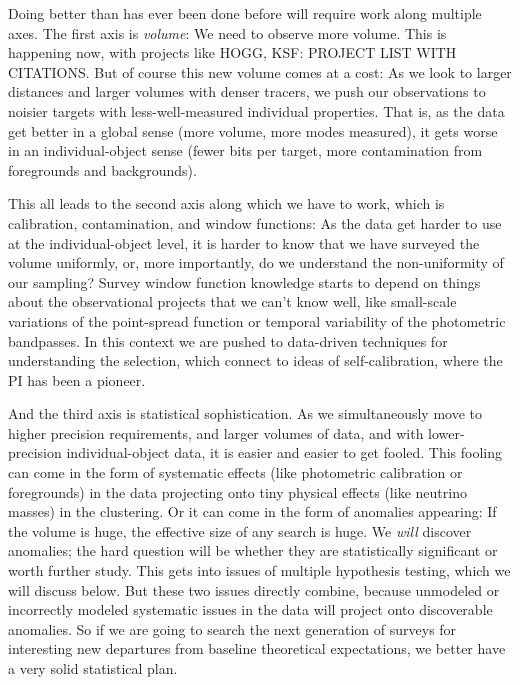 \documentclass[12pt, fullpage, letterpaper]{article}
\begin{document}
Doing better than has ever been done before will require work along
multiple axes.
The first axis is \emph{volume}: We need to observe more volume. This
is happening now, with projects like HOGG, KSF: PROJECT LIST WITH
CITATIONS.
But of course this new volume comes at a cost: As we look to larger
distances and larger volumes with denser tracers, we push our
observations to noisier targets with less-well-measured individual
properties.
That is, as the data get better in a global sense (more volume, more
modes measured), it gets worse in an individual-object sense (fewer
bits per target, more contamination from foregrounds and backgrounds).

This all leads to the second axis along which we have to work, which
is calibration, contamination, and window functions:
As the data get harder to use at the individual-object level, it is
harder to know that we have surveyed the volume uniformly, or, more
importantly, do we understand the non-uniformity of our sampling?
Survey window function knowledge starts to depend on things about the
observational projects that we can't know well, like small-scale
variations of the point-spread function or temporal variability of the
photometric bandpasses.
In this context we are pushed to data-driven techniques for
understanding the selection, which connect to ideas of
self-calibration, where the PI has been a pioneer.

And the third axis is statistical sophistication.
As we simultaneously move to higher precision requirements, and larger
volumes of data, and with lower-precision individual-object data, it is 
easier and easier to get fooled.
This fooling can come in the form of systematic effects (like
photometric calibration or foregrounds) in the data projecting onto
tiny physical effects (like neutrino masses) in the clustering.
Or it can come in the form of anomalies appearing: If the volume is
huge, the effective size of any search is huge.
We \emph{will} discover anomalies; the hard question will be whether
they are statistically significant or worth further study.
This gets into issues of multiple hypothesis testing, which we will
discuss below.
But these two issues directly combine, because unmodeled or
incorrectly modeled systematic issues in the data will project onto
discoverable anomalies.
So if we are going to search the next generation of surveys for
interesting new departures from baseline theoretical expectations,
we better have a very solid statistical plan.
\end{document}
